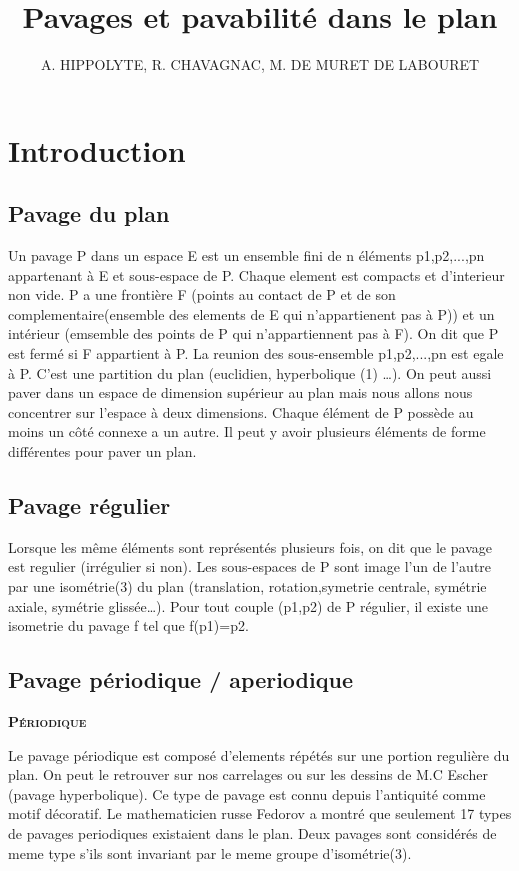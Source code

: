 \documentclass{article}
\title{Pavages et pavabilité dans le plan}
\author{A. HIPPOLYTE, R. CHAVAGNAC, M. DE MURET DE LABOURET}
\begin{document}
\maketitle

\tableofcontents

\section{Introduction}

\subsection{Pavage du plan}

Un pavage P dans un espace E est un ensemble fini de n éléments {p1,p2,...,pn} appartenant à E et sous-espace de P. Chaque element est compacts et d’interieur non vide.
P a une frontière F (points au contact de P et de son complementaire(ensemble des elements de E qui n'appartienent pas à P)) et un intérieur (emsemble des points de P qui n'appartiennent pas à F).
On dit que P est fermé si F appartient à P.
La reunion des sous-ensemble {p1,p2,...,pn} est egale à P. C'est une partition du plan (euclidien, hyperbolique (1) …).
On peut aussi paver dans un espace de dimension supérieur au plan mais nous allons nous concentrer sur l’espace à deux dimensions.
Chaque élément de P possède au moins un côté connexe a un autre.
Il peut y avoir plusieurs éléments de forme différentes pour paver un plan.

\subsection{Pavage régulier}

Lorsque les même éléments sont représentés plusieurs fois, on dit que le pavage est regulier (irrégulier si non).
Les sous-espaces de P sont image l’un de l’autre par une isométrie(3) du plan (translation, rotation,symetrie centrale, symétrie axiale, symétrie glissée…).
Pour tout couple (p1,p2) de P régulier, il existe une isometrie du pavage f tel que f(p1)=p2.


\subsection{Pavage périodique / aperiodique}

\textbf{\textsc{Périodique}}

Le pavage périodique est composé d'elements répétés sur une portion regulière du plan.
On peut le retrouver sur nos carrelages ou sur les dessins de M.C Escher (pavage hyperbolique).
Ce type de pavage est connu depuis l’antiquité comme motif décoratif.
Le mathematicien russe Fedorov a montré que seulement 17 types de pavages periodiques existaient dans le plan.
Deux pavages sont considérés de meme type s’ils sont invariant par le meme groupe d’isométrie(3).
\end{document}
